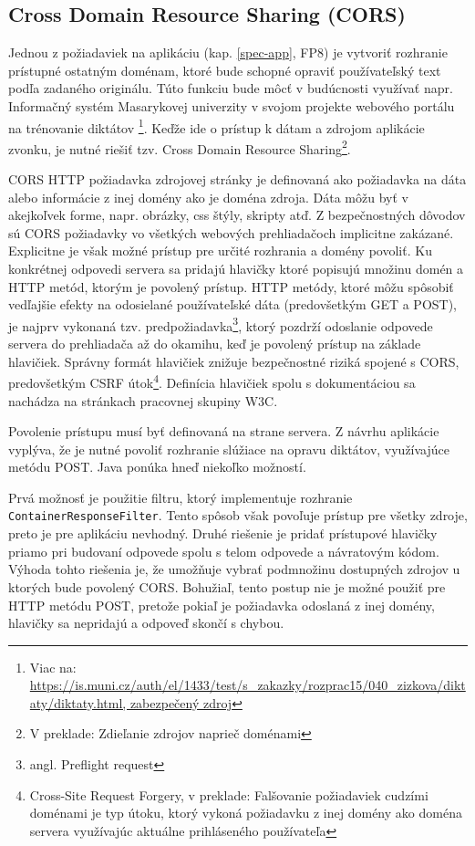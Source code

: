 \documentclass[12pt,oneside]{fithesis2}
\begin{document}
		\subsection{Cross Domain Resource Sharing (CORS)} \label{cors}
      		\par Jednou z požiadaviek na aplikáciu (kap. \ref{spec-app}, FP8) je vytvoriť rozhranie prístupné ostatným doménam, ktoré bude schopné opraviť používateľský text podľa zadaného originálu. Túto funkciu bude môcť v budúcnosti využívať napr. Informačný systém Masarykovej univerzity v svojom projekte webového portálu na trénovanie diktátov \footnote{Viac na: \url{https://is.muni.cz/auth/el/1433/test/s_zakazky/rozprac15/040_zizkova/diktaty/diktaty.html, zabezpečený zdroj}}. Keďže ide o prístup k dátam a zdrojom aplikácie zvonku, je nutné riešiť tzv. Cross Domain Resource Sharing\footnote{V preklade: Zdieľanie zdrojov naprieč doménami}.
      		\par CORS HTTP požiadavka zdrojovej stránky je definovaná ako požiadavka na dáta alebo informácie z inej domény ako je doména zdroja. Dáta môžu byť v akejkoľvek forme, napr. obrázky, css štýly, skripty atď. Z bezpečnostných dôvodov sú CORS požiadavky vo všetkých webových prehliadačoch implicitne zakázané. Explicitne je však možné prístup pre určité rozhrania a domény povoliť. Ku konkrétnej odpovedi servera sa pridajú hlavičky ktoré popisujú množinu domén a HTTP metód, ktorým je povolený prístup. HTTP metódy, ktoré môžu spôsobiť vedľajšie efekty na odosielané používateľské dáta (predovšetkým GET a POST), je najprv vykonaná tzv. predpožiadavka\footnote{angl. Preflight request}, ktorý pozdrží odoslanie odpovede servera do prehliadača až do okamihu, keď je povolený prístup na základe hlavičiek\cite{mozilla2015}. Správny formát hlavičiek znižuje bezpečnostné riziká spojené s CORS, predovšetkým CSRF útok\footnote{Cross-Site Request Forgery, v preklade: Falšovanie požiadaviek cudzími doménami je typ útoku, ktorý vykoná požiadavku z inej domény ako doména servera využívajúc aktuálne prihláseného používateľa}\cite{sof4}. Definícia hlavičiek spolu s dokumentáciou sa nachádza na stránkach pracovnej skupiny W3C\cite{w3c2014}.
      		\par Povolenie prístupu musí byť definovaná na strane servera. Z návrhu aplikácie vyplýva, že je nutné povoliť rozhranie slúžiace na opravu diktátov, využívajúce metódu POST. Java ponúka hneď niekoľko možností.
      		\par Prvá možnosť je použitie filtru, ktorý implementuje rozhranie \texttt{ContainerResponseFilter}\cite{matei14}\cite{sof3}. Tento spôsob však povoľuje prístup pre všetky zdroje, preto je pre aplikáciu nevhodný. Druhé riešenie je pridať prístupové hlavičky priamo pri budovaní odpovede spolu s telom odpovede a návratovým kódom. Výhoda tohto riešenia je, že umožňuje vybrať podmnožinu dostupných zdrojov u ktorých bude povolený CORS. Bohužiaľ, tento postup nie je možné použiť pre HTTP metódu POST, pretože pokiaľ je požiadavka odoslaná z inej domény, hlavičky sa nepridajú a odpoveď skončí s chybou\cite{sof2}. 
\end{document}
